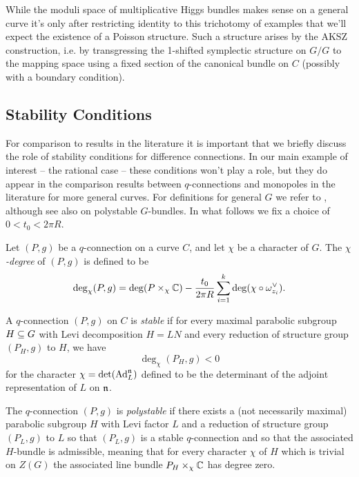 \documentclass[10pt, oneside]{article}
\begin{document}
\begin{remark}
While the moduli space of multiplicative Higgs bundles makes sense on a general curve it's only after restricting identity to this trichotomy of examples that we'll expect the existence of a Poisson structure.  Such a structure arises by the AKSZ construction, i.e. by transgressing the 1-shifted symplectic structure on $G/G$ to the mapping space using a fixed section of the canonical bundle on $C$ (possibly with a boundary condition).  
\end{remark}

\subsection{Stability Conditions}
For comparison to results in the literature it is important that we briefly discuss the role of stability conditions for difference connections.  In our main example of interest -- the rational case -- these conditions won't play a role, but they do appear in the comparison results between $q$-connections and monopoles in the literature for more general curves.  For definitions for general $G$ we refer to \cite{Smith}, although see also \cite{AnchoucheBiswas} on polystable $G$-bundles.  In what follows we fix a choice of $0 < t_0 < 2\pi R$.

\begin{definition}
Let $(P,g)$ be a $q$-connection on a curve $C$, and let $\chi$ be a character of $G$.  The \emph{$\chi$-degree} of $(P,g)$ is defined to be 
\[\deg_\chi(P,g) = \deg(P \times_\chi \mathbb{C}) - \frac {t_0}{2\pi R} \sum_{i=1}^k \deg(\chi \circ \omega^\vee_{z_i}).\]

 

A $q$-connection $(P,g)$ on $C$ is \emph{stable} if for every maximal parabolic subgroup $H \subseteq G$ with Levi decomposition $H = LN$ and every reduction of structure group $(P_H, g)$ to $H$, we have
\[\deg_\chi(P_H, g) < 0\]
for the character $\chi = \det(\mathrm{Ad}_L^{\mathfrak{n}})$ defined to be the determinant of the adjoint representation of $L$ on $\mathfrak{n}$.

The $q$-connection $(P,g)$ is \emph{polystable} if there exists a (not necessarily maximal) parabolic subgroup $H$ with Levi factor $L$ and a reduction of structure group $(P_L, g)$ to $L$ so that $(P_L,g)$ is a stable $q$-connection and so that the associated $H$-bundle is admissible, meaning that for every character $\chi$ of $H$ which is trivial on $Z(G)$ the associated line bundle $P_H \times_\chi \mathbb{C}$ has degree zero. 
\end{definition}
\end{document}

